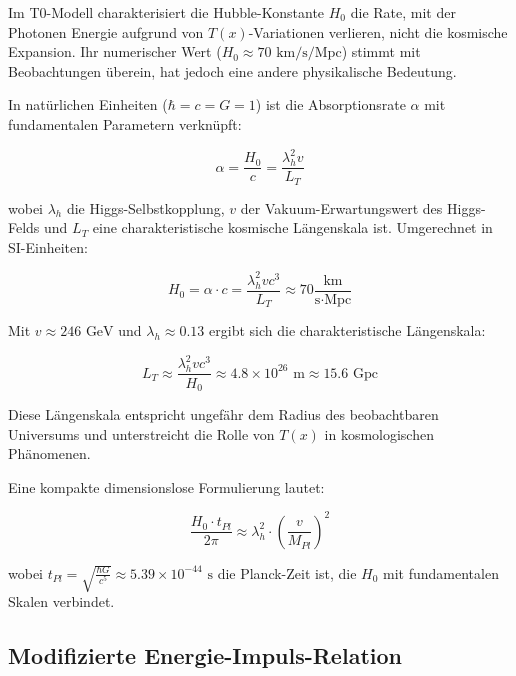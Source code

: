 \documentclass[a4paper,12pt]{article}
\theoremstyle{definition}
\theoremstyle{remark}
\newcommand{\Tfield}{T(x)} %
\begin{document}
	Im T0-Modell charakterisiert die Hubble-Konstante \(H_0\) die Rate, mit der Photonen Energie aufgrund von \(\Tfield\)-Variationen verlieren, nicht die kosmische Expansion. Ihr numerischer Wert (\(H_0 \approx 70 \text{ km/s/Mpc}\)) stimmt mit Beobachtungen überein, hat jedoch eine andere physikalische Bedeutung.
	
	In natürlichen Einheiten (\(\hbar = c = G = 1\)) ist die Absorptionsrate \(\alpha\) mit fundamentalen Parametern verknüpft:
	
	\begin{equation}
		\alpha = \frac{H_0}{c} = \frac{\lambda_h^2 v}{L_T}
	\end{equation}
	
	wobei \(\lambda_h\) die Higgs-Selbstkopplung, \(v\) der Vakuum-Erwartungswert des Higgs-Felds und \(L_T\) eine charakteristische kosmische Längenskala ist. Umgerechnet in SI-Einheiten:
	
	\begin{equation}
		H_0 = \alpha \cdot c = \frac{\lambda_h^2 v c^3}{L_T} \approx 70 \frac{\text{km}}{\text{s} \cdot \text{Mpc}}
	\end{equation}
	
	Mit \(v \approx 246 \text{ GeV}\) und \(\lambda_h \approx 0.13\) ergibt sich die charakteristische Längenskala:
	
	\begin{equation}
		L_T \approx \frac{\lambda_h^2 v c^3}{H_0} \approx 4.8 \times 10^{26} \text{ m} \approx 15.6 \text{ Gpc}
	\end{equation}
	
	Diese Längenskala entspricht ungefähr dem Radius des beobachtbaren Universums und unterstreicht die Rolle von \(\Tfield\) in kosmologischen Phänomenen.
	
	Eine kompakte dimensionslose Formulierung lautet:
	
	\begin{equation}
		\frac{H_0 \cdot t_{Pl}}{2\pi} \approx \lambda_h^2 \cdot \left(\frac{v}{M_{Pl}}\right)^2
	\end{equation}
	
	wobei \(t_{Pl} = \sqrt{\frac{\hbar G}{c^5}} \approx 5.39 \times 10^{-44} \text{ s}\) die Planck-Zeit ist, die \(H_0\) mit fundamentalen Skalen verbindet.
	
	\subsection{Modifizierte Energie-Impuls-Relation}
	
\end{document}
